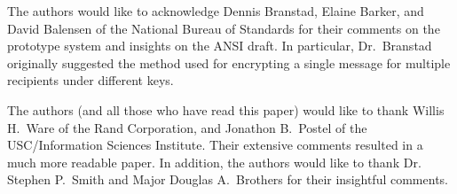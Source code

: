The authors would like to acknowledge Dennis Branstad,
Elaine Barker, and David Balensen of the National Bureau of Standards
for their comments on the prototype system
and insights on the ANSI draft\cite{FIKM}.
In particular, Dr.~Branstad originally suggested the method used for
encrypting a single message for multiple recipients under different keys.

The authors (and all those who have read this paper) would like to thank
Willis H.~Ware of the Rand Corporation,
and Jonathon B.~Postel of the USC/Information Sciences Institute.
Their extensive comments resulted in a much more readable paper.
In addition,
the authors would like to thank
Dr. Stephen P.~Smith and Major Douglas A.~Brothers
for their insightful comments.

